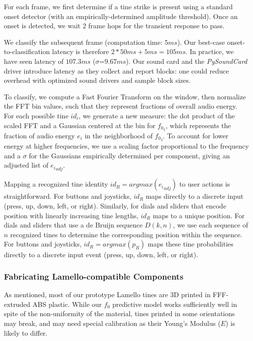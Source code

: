     For each frame, we first determine if a tine strike is present using a standard onset detector (with an empirically-determined amplitude threshold). Once an onset is detected, we wait 2 frame hops for the transient response to pass.
    
    We classify the subsequent frame (computation time: $5ms$). Our best-case onset-to-classification latency is therefore $2 * 50ms + 5ms = 105ms$.  In practice, we have seen latency of $107.3ms$ ($\sigma$=$9.67ms$). Our sound card and the \emph{PySoundCard} driver introduce latency as they collect and report blocks: one could reduce overhead with optimized sound drivers and sample block sizes.

    To classify, we compute a Fast Fourier Transform on the window, then normalize the FFT bin values, such that they represent fractions of overall audio energy. For each possible tine $id_i$, we generate a new measure: the dot product of the scaled FFT and a Gaussian centered at the bin for ${f_0}_i$, which represents the fraction of audio energy $e_i$ in the neighborhood of ${f_0}_i$. To account for lower energy at higher frequencies, we use a scaling factor proportional to the frequency and a $\sigma$ for the Gaussians empirically determined per component, giving an adjusted list of ${e_i}_{adj}$. 

    Mapping a recognized tine identity $id_R=argmax({e_i}_{adj})$ to user actions is straightforward. For buttons and joysticks, $id_R$ maps directly to a discrete input (press, up, down, left, or right). Similarly, for dials and sliders that encode position with linearly increasing tine lengths, $id_R$ maps to a unique position. For dials and sliders that use a de Bruijn sequence $D(k, n)$, we use each sequence of $n$ recognized tines to determine the corresponding position within the sequence. For buttons and joysticks, $id_R=argmax(p_R)$ maps these tine probabilities directly to a discrete input event (press, up, down, left, or right).

    \subsubsection{Fabricating Lamello-compatible Components}
    
    As mentioned, most of our prototype Lamello tines are 3D printed in FFF-extruded ABS plastic. While our $f_0$ predictive model works sufficiently well in spite of the non-uniformity of the material, tines printed in some orientations may break, and may need special calibration as their Young's Modulus ($E$) is likely to differ.
    
